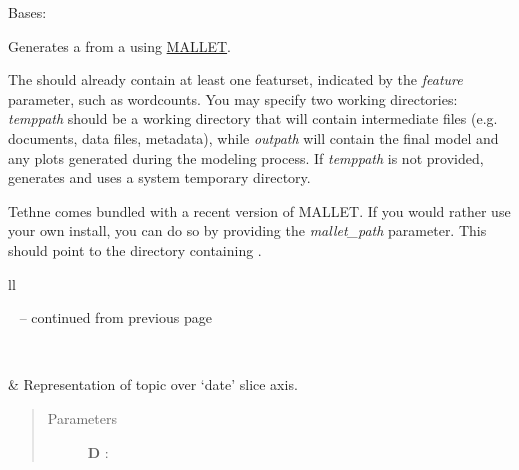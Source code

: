 \documentclass[letterpaper,10pt,english]{sphinxmanual}
\begin{document}
\begin{fulllineitems}
\label{tethne.model.managers.mallet:tethne.model.managers.mallet.MALLETModelManager}
Bases: {\hyperref[tethne.model.managers:tethne.model.managers.ModelManager]{}}

Generates a {\hyperref[tethne.model.corpus.ldamodel:tethne.model.corpus.ldamodel.LDAModel]{}} from a {\hyperref[tethne.classes.corpus:tethne.classes.corpus.Corpus]{}} using
\href{http://mallet.cs.umass.edu/}{MALLET}.

The {\hyperref[tethne.classes.corpus:tethne.classes.corpus.Corpus]{}} should already contain at least one featurset,
indicated by the \emph{feature} parameter, such as wordcounts. You may
specify two working directories: \emph{temppath} should be a working
directory that will contain intermediate files (e.g. documents, data
files, metadata), while \emph{outpath} will contain the final model and any 
plots generated during the modeling process. If \emph{temppath} is not
provided, generates and uses a system temporary directory.

Tethne comes bundled with a recent version of MALLET. If you would
rather use your own install, you can do so by providing the 
\emph{mallet\_path} parameter. This should point to the directory containing
.

\begin{longtable}{ll}
\hline
\endfirsthead

%
{{\textsf{\tablename\ \thetable{} -- continued from previous page}}} \\
\hline
\endhead

\hline {} \\ \hline
\endfoot

\endlastfoot


{\hyperref[tethne.model.managers.mallet:tethne.model.managers.mallet.MALLETModelManager.topic_over_time]{}}
 & 
Representation of topic  over `date' slice axis.
\\
\hline\end{longtable}

\begin{quote}\begin{description}
\item[{Parameters}] \leavevmode
\textbf{D} : {\hyperref[tethne.classes.corpus:tethne.classes.corpus.Corpus]{}}


\end{description}
\end{quote}
\end{fulllineitems}
\end{document}
